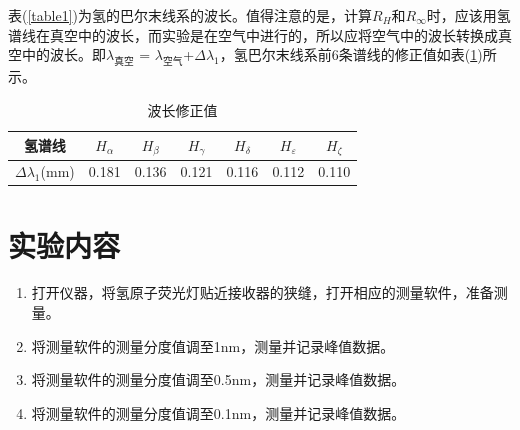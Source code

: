 \documentclass[a4paper]{article}
\begin{document}
表(\ref{table1})为氢的巴尔末线系的波长。值得注意的是，计算$R_H$和$R_{\infty}$时，应该用氢谱线在真空中的波长，而实验是在空气中进行的，所以应将空气中的波长转换成真空中的波长。即$\lambda_{\text{真空}}$ = $\lambda_{\text{空气}}$+$\Delta \lambda_1$，氢巴尔末线系前6条谱线的修正值如表(\ref{table2})所示。
\begin{table}[!h]
\centering
\caption{波长修正值}
\label{table2}
\begin{tabular}{|c|c|c|c|c|c|c|}
\hline
氢谱线                    & $H_{\alpha}$ & $H_{\beta}$ & $H_{\gamma}$ & $H_{\delta}$ & $H_{\varepsilon}$ & $H_{\zeta}$ \\ \hline
$\Delta \lambda_1$(mm) & 0.181        & 0.136       & 0.121        & 0.116        & 0.112             & 0.110       \\ \hline
\end{tabular}
\end{table}

\section{实验内容}
\begin{enumerate}
\item 打开仪器，将氢原子荧光灯贴近接收器的狭缝，打开相应的测量软件，准备测量。
\item 将测量软件的测量分度值调至1nm，测量并记录峰值数据。
\item 将测量软件的测量分度值调至0.5nm，测量并记录峰值数据。
\item 将测量软件的测量分度值调至0.1nm，测量并记录峰值数据。
\end{enumerate}
\end{document}
